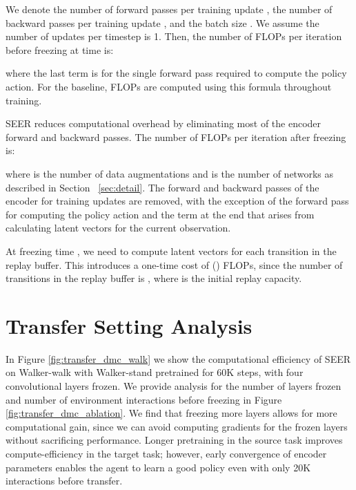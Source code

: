 \documentclass{article}
\begin{document}
We denote the number of forward passes per training update , the number of backward passes per training update , and the batch size . We assume the number of updates per timestep is 1. Then, the number of FLOPs per iteration before freezing at time  is:
\begin{center}
    
\end{center}
where the last term is for the single forward pass required to compute the policy action. For the baseline, FLOPs are computed using this formula throughout training.

SEER reduces computational overhead by eliminating most of the encoder forward and backward passes. The number of FLOPs per iteration after freezing is:
\begin{center}
    
\end{center}
where  is the number of data augmentations and  is the number of networks as described in Section ~\ref{sec:detail}. The forward and backward passes of the encoder for training updates are removed, with the exception of the forward pass for computing the policy action and the  term at the end that arises from calculating latent vectors for the current observation.

At freezing time , we need to compute latent vectors for each transition in the replay buffer. This introduces a one-time cost of () FLOPs, since the number of transitions in the replay buffer is , where  is the initial replay capacity. 





\section{Transfer Setting Analysis} \label{appendix:additional_transfer_dmc}


In Figure \ref{fig:transfer_dmc_walk} we show the computational efficiency of SEER on Walker-walk with Walker-stand pretrained for 60K steps, with four convolutional layers frozen. We provide analysis for the number of layers frozen and number of environment interactions before freezing  in Figure \ref{fig:transfer_dmc_ablation}. We find that freezing more layers allows for more computational gain, since we can avoid computing gradients for the frozen layers without sacrificing performance. Longer pretraining in the source task improves compute-efficiency in the target task; however, early convergence of encoder parameters enables the agent to learn a good policy even with only 20K interactions before transfer.
\end{document}
